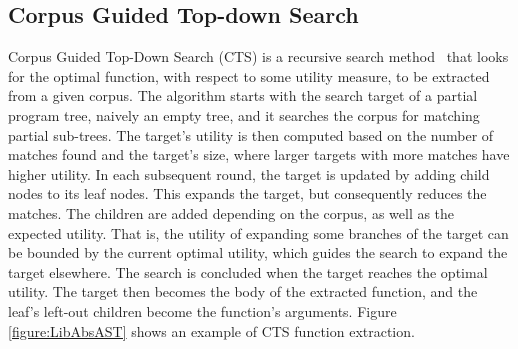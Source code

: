 \subsection{Corpus Guided Top-down Search}
Corpus Guided Top-Down Search (CTS) is a recursive search method~\cite{Bowers_2023stitch} that looks for the optimal function, with respect to some utility measure, to be extracted from a given corpus. The algorithm starts with the search target of a partial program tree, naively an empty tree, and it searches the corpus for matching partial sub-trees. The target's utility is then computed based on the number of matches found and the target's size, where larger targets with more matches have higher utility. In each subsequent round, the target is updated by adding child nodes to its leaf nodes. This expands the target, but consequently reduces the matches. The children are added depending on the corpus, as well as the expected utility. That is, the utility of expanding some branches of the target can be bounded by the current optimal utility, which guides the search to expand the target elsewhere. The search is concluded when the target reaches the optimal utility. The target then becomes the body of the extracted function, and the leaf's left-out children become the function's arguments. Figure \ref{figure:LibAbsAST} shows an example of CTS function extraction.  %


